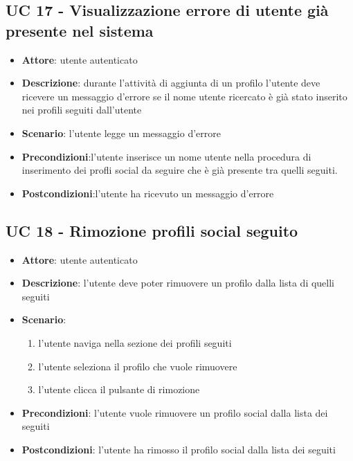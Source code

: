 \subsection{UC 17 - Visualizzazione errore di utente già presente nel sistema}
\begin{itemize}
    \item \textbf{Attore}: utente autenticato
    \item \textbf{Descrizione}: durante l’attività di aggiunta di un profilo l’utente deve ricevere un messaggio d’errore se il nome utente ricercato è già stato inserito nei profili seguiti dall’utente
    \item \textbf{Scenario}: l’utente legge un messaggio d’errore
    \item \textbf{Precondizioni}:l’utente inserisce un nome utente nella procedura di inserimento dei profli social da seguire che è già presente tra quelli seguiti.
    \item \textbf{Postcondizioni}:l’utente ha ricevuto un messaggio d’errore
\end{itemize}

\subsection{UC 18 - Rimozione profili social seguito}
\begin{itemize}
    \item \textbf{Attore}: utente autenticato
    \item \textbf{Descrizione}: l’utente deve poter rimuovere un profilo dalla lista di quelli seguiti
    \item \textbf{Scenario}: 
        \begin{enumerate}
            \item l’utente naviga nella sezione dei profili seguiti
            \item l’utente seleziona il profilo che vuole rimuovere
            \item l’utente clicca il pulsante di rimozione
        \end{enumerate}
    \item \textbf{Precondizioni}: l’utente vuole rimuovere un profilo social dalla lista dei seguiti
    \item \textbf{Postcondizioni}: l’utente ha rimosso il profilo social dalla lista dei seguiti
\end{itemize}


